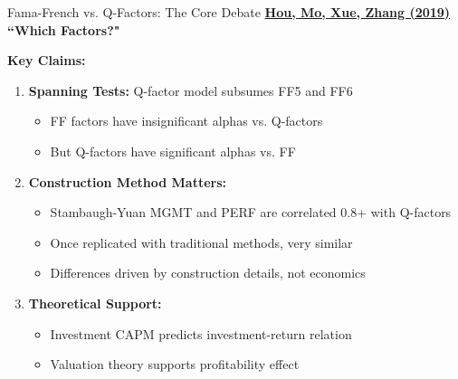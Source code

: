 \documentclass{beamer}
\begin{document}
\begin{frame}{Fama-French vs. Q-Factors: The Core Debate}
    \textbf{\textcolor{blue}{\href{https://doi.org/10.1093/rof/rfy032}{Hou, Mo, Xue, Zhang (2019)}} ``Which Factors?"}
    
    \textbf{Key Claims:}
    \begin{enumerate}
        \item \textbf{Spanning Tests:} Q-factor model subsumes FF5 and FF6
        \begin{itemize}
            \item FF factors have insignificant alphas vs. Q-factors
            \item But Q-factors have significant alphas vs. FF
        \end{itemize}
        
        \item \textbf{Construction Method Matters:}
        \begin{itemize}
            \item Stambaugh-Yuan MGMT and PERF are correlated 0.8+ with Q-factors
            \item Once replicated with traditional methods, very similar
            \item Differences driven by construction details, not economics
        \end{itemize}
        
        \item \textbf{Theoretical Support:}
        \begin{itemize}
            \item Investment CAPM predicts investment-return relation
            \item Valuation theory supports profitability effect
        \end{itemize}
    \end{enumerate}
\end{frame}
\end{document}
